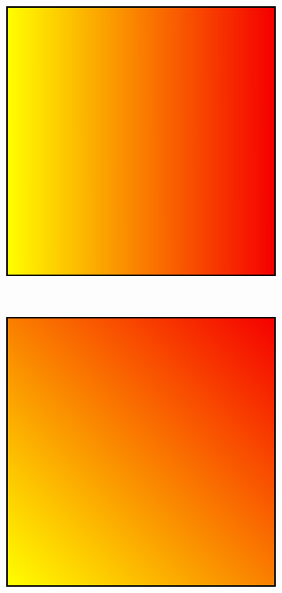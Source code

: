 \begin{figure}[t]
\begin{subfigure}[b]{0.2\textwidth}
      \caption{}
      \label{fig:stretched}
  \end{subfigure}
  \hfill
  \begin{subfigure}[b]{0.2\textwidth}
      \centering
      \includegraphics[width=\textwidth]{papers/swarm-intelligence2021/img/scenario/one-direction.pdf}
      \caption{}
      \label{fig:one-direction}
  \end{subfigure}
  \\
  \centering
  \begin{subfigure}[b]{0.2\textwidth}
      \centering
      \includegraphics[width=\textwidth]{papers/swarm-intelligence2021/img/scenario/one-direction-one-candidate.pdf}

\end{subfigure}
\end{figure}

